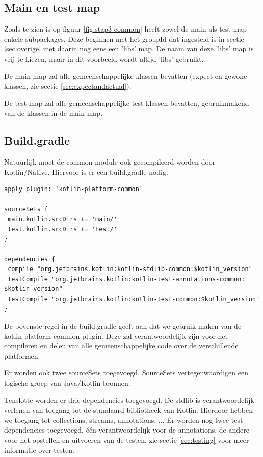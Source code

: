 \subsection{Main en test map}
\label{sec:maintestcommon}
Zoals te zien is op figuur \ref{fig:stap3-common} heeft zowel de main als test map enkele subpackages. Deze beginnen met het groupId dat ingesteld is in sectie \ref{sec:overige} met daarin nog eens een 'libs' map. De naam van deze 'libs' map is vrij te kiezen, maar in dit voorbeeld wordt altijd 'libs' gebruikt.

De main map zal alle gemeenschappelijke klassen bevatten (expect en gewone klassen, zie sectie \ref{sec:expectandactual}).

De test map zal alle gemeenschappelijke test klassen bevatten, gebruikmakend van de klassen in de main map.

\subsection{Build.gradle}
Natuurlijk moet de common module ook gecompileerd worden door Kotlin/Native. Hiervoor is er een build.gradle nodig.

\begin{lstlisting}
apply plugin: 'kotlin-platform-common'

sourceSets {
 main.kotlin.srcDirs += 'main/'
 test.kotlin.srcDirs += 'test/'
}

dependencies {
 compile "org.jetbrains.kotlin:kotlin-stdlib-common:$kotlin_version"
 testCompile "org.jetbrains.kotlin:kotlin-test-annotations-common: $kotlin_version"
 testCompile "org.jetbrains.kotlin:kotlin-test-common:$kotlin_version"
}
\end{lstlisting}
De bovenste regel in de build.gradle geeft aan dat we gebruik maken van de kotlin-platform-common plugin. Deze zal verantwoordelijk zijn voor het compileren en delen van alle gemeenschappelijke code over de verschillende platformen.

Er worden ook twee sourceSets toegevoegd. SourceSets vertegenwoordigen een logische groep van Java/Kotlin bronnen.

Tenslotte worden er drie dependencies toegevoegd. De stdlib is verantwoordelijk verlenen van toegang tot de standaard bibliotheek van Kotlin. Hierdoor hebben we toegang tot collections, streams, annotations, ... Er worden nog twee test dependencies toegevoegd, één verantwoordelijk voor de annotations, de andere voor het opstellen en uitvoeren van de testen, zie sectie \ref{sec:testing} voor meer informatie over testen.

